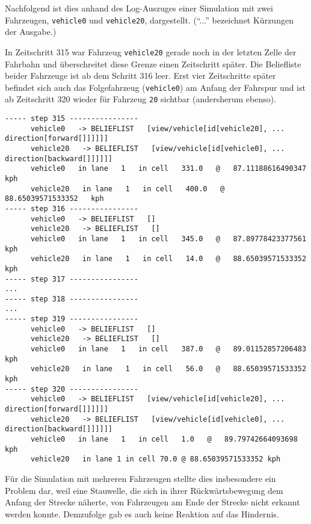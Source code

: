 Nachfolgend ist dies anhand des Log-Auszuges einer Simulation mit zwei Fahrzeugen, \texttt{vehicle0} und \texttt{vehicle20}, dargestellt. 
(\enquote{...} bezeichnet Kürzungen der Ausgabe.)

In Zeitschritt 315 war Fahrzeug \texttt{vehicle20} gerade noch in der letzten Zelle der Fahrbahn und überschreitet diese Grenze einen Zeitschritt später.
Die Beliefliste beider Fahrzeuge ist ab dem Schritt 316 leer.
Erst vier Zeitschritte später befindet sich auch das Folgefahrzeug (\texttt{vehicle0}) am Anfang der Fahrspur und ist ab Zeitschritt 320 wieder für Fahrzeug \texttt{20} sichtbar (andersherum ebenso).

\footnotesize\begin{verbatim}
----- step 315 ----------------
      vehicle0   -> BELIEFLIST   [view/vehicle[id[vehicle20], ... direction[forward[]]]]]]
      vehicle20   -> BELIEFLIST   [view/vehicle[id[vehicle0], ... direction[backward[]]]]]]
      vehicle0   in lane   1   in cell   331.0   @   87.11188616490347   kph
      vehicle20   in lane   1   in cell   400.0   @   88.65039571533352   kph
----- step 316 ----------------
      vehicle0   -> BELIEFLIST   []
      vehicle20   -> BELIEFLIST   []
      vehicle0   in lane   1   in cell   345.0   @   87.89778423377561   kph
      vehicle20   in lane   1   in cell   14.0   @   88.65039571533352   kph
----- step 317 ----------------
...
----- step 318 ----------------
...
----- step 319 ----------------
      vehicle0   -> BELIEFLIST   []
      vehicle20   -> BELIEFLIST   []
      vehicle0   in lane   1   in cell   387.0   @   89.01152857206483   kph
      vehicle20   in lane   1   in cell   56.0   @   88.65039571533352   kph
----- step 320 ----------------
      vehicle0   -> BELIEFLIST   [view/vehicle[id[vehicle20], ... direction[forward[]]]]]]
      vehicle20   -> BELIEFLIST   [view/vehicle[id[vehicle0], ... direction[backward[]]]]]]
      vehicle0   in lane   1   in cell   1.0   @   89.79742664093698   kph
      vehicle20   in lane 1 in cell 70.0 @ 88.65039571533352 kph
\end{verbatim}
\normalsize

Für die Simulation mit mehreren Fahrzeugen stellte dies insbesondere ein Problem dar, weil eine Stauwelle, die sich in ihrer Rückwärtsbewegung dem Anfang der Strecke näherte, von Fahrzeugen am Ende der Strecke nicht erkannt werden konnte.
Demzufolge gab es auch keine Reaktion auf das Hindernis.

